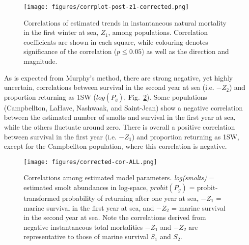 \documentclass[12pt]{article}
\begin{document}
\begin{figure}[htbp] \centering
    \texttt{[image: figures/corrplot-post-z1-corrected.png]} \caption{
        Correlations of estimated trends in instantaneous natural mortality in the first winter at sea, $Z_1$, among populations.
        Correlation coefficients are shown in each square, while colouring
        denotes significance of the correlation ($p \leq 0.05$) as well as the direction and magnitude.}
\label{fig:s1-corr}
\end{figure}

As is expected from Murphy's method, there are strong negative, yet highly uncertain, correlations
between survival in the second year at sea (i.e. $-Z_2$) and proportion returning
as 1SW ($log(P_g)$, Fig.~\ref{fig:cor-params}). Some populations (Campbellton,
LaHave, Nashwaak, and Saint-Jean) show a negative correlation between the
estimated number of smolts and survival in the first year at sea, while the
others fluctuate around zero. There is overall a positive correlation between
survival in the first year (i.e. $-Z_1$) and proportion returning as 1SW,
except for the Campbellton population, where this correlation is negative.


\begin{figure}[htbp] \centering
    \texttt{[image: figures/corrected-cor-ALL.png]}
    \caption{Correlations among estimated model parameters. \emph{log(smolts)} = estimated smolt abundances in log-space, $probit(P_g)$ = probit-transformed probability of
        returning after one year at sea, $-Z_1$ = marine survival in the first year at sea, and $-Z_2$ = marine survival in the second year at sea.
        Note the correlations derived from negative instantaneous total mortalities $-Z_1$ and $-Z_2$ are representative to those of marine survival $S_1$ and $S_2$.}
    \label{fig:cor-params}
\end{figure}
\end{document}
